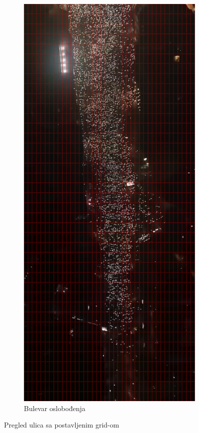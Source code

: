 \documentclass[a4paper,12pt]{article}
\begin{document}
\begin{figure}[H]
\begin{subfigure}[b]{0.3\textwidth}
	\end{subfigure}
	\hfill
	\begin{subfigure}[b]{0.3\textwidth}
	  \centering
	  \includegraphics[width=\textwidth]{../grid_output/bulevar-oslobodjenja_grid.png}
	  \caption{Bulevar oslobođenja}
	  \label{fig:bulevar-oslobodjenja}
	\end{subfigure}
  
	\caption{Pregled ulica sa postavljenim grid-om}
\end{figure}
\end{document}
